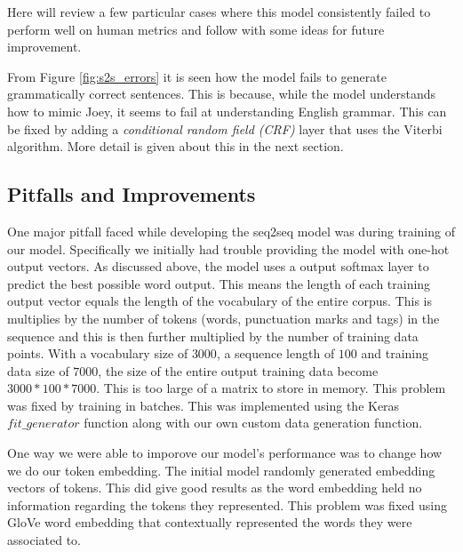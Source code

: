 Here will review a few particular cases where this model consistently failed to perform well on human metrics and follow with some ideas for future improvement.

From Figure \ref{fig:s2s_errors} it is seen how the model fails to generate grammatically correct sentences. This is because, while the model understands how to mimic Joey, it seems to fail at understanding English grammar. This can be fixed by adding a \emph{conditional random field (CRF)} layer that uses the Viterbi algorithm. More detail is given about this in the next section.


\subsection{Pitfalls and Improvements}
One major pitfall faced while developing the seq2seq model was during training of our model. 
Specifically we initially had trouble providing the model with one-hot output vectors. 
As discussed above, the model uses a output softmax layer to predict the best possible word output. 
This means the length of each training output vector equals the length of the vocabulary of the entire corpus. 
This is multiplies by the number of tokens (words, punctuation marks and tags) in the sequence and this is then further multiplied by the number of training data points. 
With a vocabulary size of $3000$, a sequence length of $100$ and training data size of $7000$, the size of the entire output training data become $3000*100*7000$. 
This is too large of a matrix to store in memory. 
This problem was fixed by training in batches.
This was implemented using the Keras $fit\_generator$ function along with our own custom data generation function. 

One way we were able to imporove our model's performance was to change how we do our token embedding.
The initial model randomly generated embedding vectors of tokens. 
This did give good results as the word embedding held no information regarding the tokens they represented. 
This problem was fixed using GloVe word embedding that contextually represented the words they were associated to.
 
